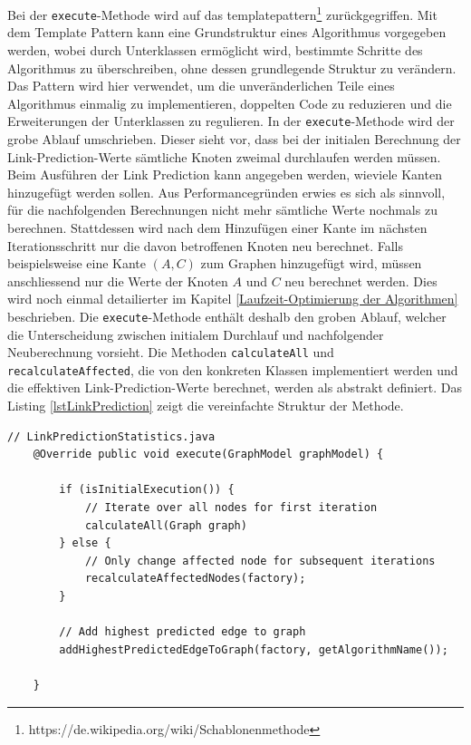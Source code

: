 Bei der \texttt{execute}-Methode wird auf das \acs{templatepattern}\footnote{https://de.wikipedia.org/wiki/Schablonenmethode} zurückgegriffen. Mit dem Template Pattern kann eine Grundstruktur eines Algorithmus vorgegeben werden, wobei durch Unterklassen ermöglicht wird, bestimmte Schritte des Algorithmus zu überschreiben, ohne dessen grundlegende Struktur zu verändern.
Das Pattern wird hier verwendet, um die unveränderlichen Teile eines Algorithmus einmalig zu implementieren, doppelten Code zu reduzieren und die Erweiterungen der Unterklassen zu regulieren.
In der \texttt{execute}-Methode wird der grobe Ablauf umschrieben.
Dieser sieht vor, dass bei der initialen Berechnung der Link-Prediction-Werte sämtliche Knoten zweimal durchlaufen werden müssen.
Beim Ausführen der Link Prediction kann angegeben werden, wieviele Kanten hinzugefügt werden sollen.
Aus Performancegründen erwies es sich als sinnvoll, für die nachfolgenden Berechnungen nicht mehr sämtliche Werte nochmals zu berechnen.
Stattdessen wird nach dem Hinzufügen einer Kante im nächsten Iterationsschritt nur die davon betroffenen Knoten neu berechnet.
Falls beispielsweise eine Kante $(A, C)$ zum Graphen hinzugefügt wird, müssen anschliessend nur die Werte der Knoten $A$ und $C$ neu berechnet werden.
Dies wird noch einmal detailierter im Kapitel \ref{Laufzeit-Optimierung der Algorithmen} beschrieben.
Die \texttt{execute}-Methode enthält deshalb den groben Ablauf, welcher die Unterscheidung zwischen initialem Durchlauf und nachfolgender Neuberechnung vorsieht.
Die Methoden \texttt{calculateAll} und \texttt{recalculateAffected}, die von den konkreten Klassen implementiert werden und die effektiven Link-Prediction-Werte berechnet, werden als abstrakt definiert.
Das Listing \ref{lstLinkPrediction} zeigt die vereinfachte Struktur der Methode.

\begin{lstlisting}[caption={Link prediction implementation},label=lstLinkPrediction]
    // LinkPredictionStatistics.java
    @Override public void execute(GraphModel graphModel) {

        if (isInitialExecution()) {
            // Iterate over all nodes for first iteration
            calculateAll(Graph graph)
        } else {
            // Only change affected node for subsequent iterations
            recalculateAffectedNodes(factory);
        }

        // Add highest predicted edge to graph
        addHighestPredictedEdgeToGraph(factory, getAlgorithmName());

    }
\end{lstlisting}

